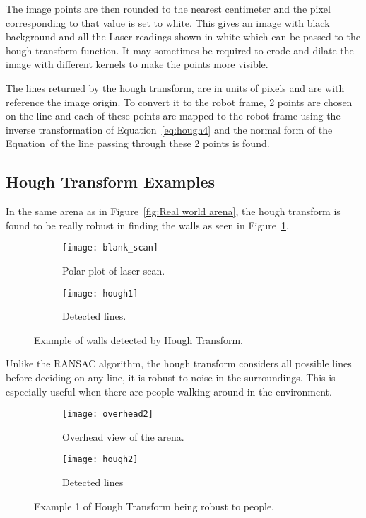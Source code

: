 The image points are then rounded to the nearest centimeter and the pixel corresponding to that value is set to white. This gives an image with black background and all the Laser readings shown in white which can be passed to the hough transform function. It may sometimes be required to erode and dilate the image with different kernels to make the points more visible. 
 
The lines returned by the hough transform, are in units of pixels and are with reference the image origin. To convert it to the robot frame, 2 points are chosen on the line and each of these points are mapped to the robot frame using the inverse transformation of Equation~\ref{eq:hough4} and the normal form of the Equation~of the line passing through these 2 points is found. 

\subsection{Hough Transform Examples}
In the same arena as in Figure~\ref{fig:Real world arena}, the hough transform is found to be really robust in finding the walls as seen in Figure~\ref{fig: hough1}.
 \begin{figure}[h!]
     \centering
     \begin{subfigure}[b]{0.45\textwidth}
     
 	    \texttt{[image: blank\_scan]}
         \caption{Polar plot of laser scan.}
     \end{subfigure}
     \quad %
     \begin{subfigure}[b]{0.45\textwidth}
         \texttt{[image: hough1]}
		 \caption{Detected lines.}
     \end{subfigure}%
         \caption{Example of walls detected by Hough Transform.}
         \label{fig: hough1}
 \end{figure}

Unlike the RANSAC algorithm, the hough transform considers all possible lines before deciding on any line, it is robust to noise in the surroundings. This is especially useful when there are people walking around in the environment.
 \begin{figure}[h!]
     \centering
     \begin{subfigure}[b]{0.45\textwidth}
     
 	    \texttt{[image: overhead2]}
         \caption{Overhead view of the arena.}
     \end{subfigure}
     \quad %
     \begin{subfigure}[b]{0.45\textwidth}
         \texttt{[image: hough2]}
		 \caption{Detected lines}
     \end{subfigure}%
         \caption{Example 1 of Hough Transform being robust to people.}
         \label{fig: hough2}
 \end{figure}
 
